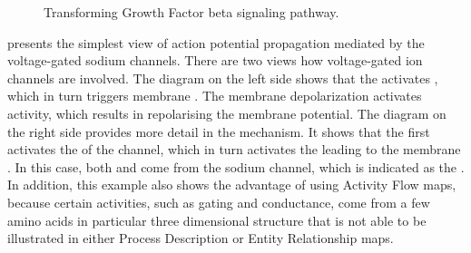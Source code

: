 \begin{figure}
\begin{center}
\caption{Transforming Growth Factor beta signaling pathway.}\label{fig:TGFbeta}
\end{center}
\end{figure}

 presents the simplest view of action potential propagation mediated by the voltage-gated sodium channels.  There are two views how voltage-gated ion channels are involved.  The diagram on the left side shows that the  activates , which in turn triggers membrane .  The membrane depolarization activates  activity, which results in repolarising the membrane potential. The diagram on the right side provides more detail in the mechanism.  It shows that the  first activates the  of the channel, which in turn activates the  leading to the membrane .  In this case, both  and  come from the sodium channel, which is indicated as the .  In addition, this example also shows the advantage of using Activity Flow maps, because certain activities, such as gating and conductance, come from a few amino acids in particular three dimensional structure that is not able to be illustrated in either Process Description or Entity Relationship maps.



